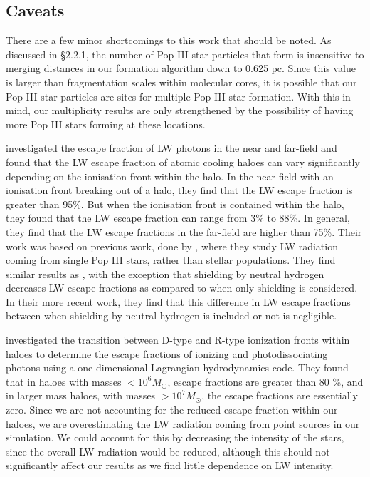 \documentclass[fleqn,usenatbib]{mnras}
\begin{document}
\subsection{Caveats}

There are a few minor shortcomings to this work that should be noted. As discussed in \S2.2.1, the number of Pop III star particles that form is insensitive to merging distances in our formation algorithm down to 0.625 pc. Since this value is larger than fragmentation scales within molecular cores, it is possible that our Pop III star particles are sites for multiple Pop III star formation. With this in mind, our multiplicity results are only strengthened by the possibility of having more Pop III stars forming at these locations.

\citet{Schauer17} investigated the escape fraction of LW photons in the near and far-field and found that the LW escape fraction of atomic cooling haloes can vary significantly depending on the ionisation front within the halo. In the near-field with an ionisation front breaking out of a halo, they find that the LW escape fraction is greater than 95\%. But when the ionisation front is contained within the halo, they found that the LW escape fraction can range from 3\% to 88\%. In general, they find that the LW escape fractions in the far-field are higher than 75\%. Their work was based on previous work, done by \citet{Schauer15}, where they study LW radiation coming from single Pop III stars, rather than stellar populations. They find similar results as \citet{Schauer17}, with the exception that \hh{} shielding by neutral hydrogen decreases LW escape fractions as compared to when only \hh{} shielding is considered. In their more recent work, they find that this difference in LW escape fractions between when \hh{} shielding by neutral hydrogen is included or not is negligible.

\citet{kitayama04} investigated the transition between D-type and R-type ionization fronts within haloes to determine the escape fractions of ionizing and photodissociating photons using a one-dimensional Lagrangian hydrodynamics code. They found that in haloes with masses $< 10^6 M_{\odot}$, escape fractions are greater than 80 \%, and in larger mass haloes, with masses $> 10^7 M_{\odot}$, the escape fractions are essentially zero. Since we are not accounting for the reduced escape fraction within our haloes, we are overestimating the LW radiation coming from point sources in our simulation. We could account for this by decreasing the intensity of the stars, since the overall LW radiation would be reduced, although this should not significantly affect our results as we find little dependence on LW intensity. 
\end{document}
